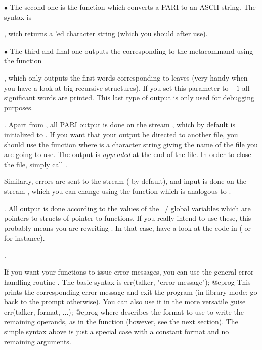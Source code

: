 \noindent $\bullet$ The second one is the function  which
converts a PARI  to an ASCII string. The syntax is

, wich returns a 'ed character
string (which you should  after use).

\noindent $\bullet$ The third and final one outputs the 
corresponding to the  metacommand  using the function

, which only outputs the first
 words corresponding to leaves (very handy when you have a look at
big recursive structures). If you set this parameter to $-1$ all significant
words are printed. This last type of output is only used for debugging purposes.

. Apart from , all PARI output is done on
the stream , which by default is initialized to . If
you want that your output be directed to another file, you should use the
function  where  is a
character string giving the name of the file you are going to use. The
output is \emph{appended} at the end of the file. In order to close
the file, simply call .

Similarly, errors are sent to the stream  (
by default), and input is done on the stream , which you can change
using the function  which is analogous to .

. All output is done according to the values
of the ~/  global variables which are pointers to
structs of pointer to functions. If you really intend to use these, this
probably means you are rewriting . In that case, have a look at the code in
 ( or  for instance).

.

\noindent
If you want your functions to issue error messages, you can use the general
error handling routine . The basic syntax is
%
\bprog
  err(talker, "error message");
@eprog\noindent
This prints the corresponding error message and exit the program (in
library mode; go back to the  prompt otherwise).\label{se:err} You can
also use it in the more versatile guise
\bprog
  err(talker, format, ...);
@eprog\noindent
where  describes the format to use to write the remaining
operands, as in the  function (however, see the next section).
The simple syntax above is just a special case with a constant format and no
remaining arguments.

